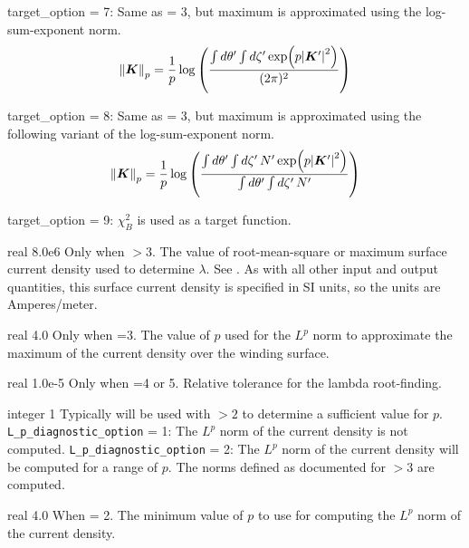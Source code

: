 {{\ttfamily target\_option} = 7: Same as  = 3, but maximum is approximated using the log-sum-exponent norm. 
\begin{gather}
\norm{\bm{K}}_p = \frac{1}{p} \log\left( \frac{\int d \theta' \int d \zeta'  \exp (p \abs{\bm{K}'}^2 ) }{ (2 \pi)^2}\right)
\end{gather}

{\ttfamily target\_option} = 8: Same as  = 3, but maximum is approximated using the following variant of the log-sum-exponent norm.
\begin{gather}
\norm{\bm{K}}_p = \frac{1}{p} \log \left( \frac{\int d \theta' \int d \zeta' \, N' \exp (p \abs{\bm{K}'}^2 ) }{ \int d \theta' \int d \zeta' \, N' }\right)
\end{gather}

{\ttfamily target\_option} = 9: $\chi^2_B$ is used as a target function.

}


\myhrule

{real}
{8.0e6}
{Only when $>3$.}
{The value of root-mean-square or maximum surface current density used to determine $\lambda$.
See .
As with all other input and output quantities, this surface current density is specified in SI units,
so the units are Amperes/meter.
}

\myhrule

{real}
{4.0}
{Only when =3.}
{The value of $p$ used for the $L^p$ norm to approximate the maximum of the current density over the
winding surface.}

\myhrule

{real}
{1.0e-5}
{Only when =4 or 5.}
{Relative tolerance for the lambda root-finding.}

\myhrule

{integer}
{1}
{Typically will be used with  $> 2$ to determine a sufficient value for $p$.}
{
\texttt{L\_p\_diagnostic\_option} = 1: The $L^p$ norm of the current density is not computed. 
\texttt{L\_p\_diagnostic\_option} = 2: The $L^p$ norm of the current density will be computed
for a range of $p$. The norms defined as documented for  $> 3$ are computed. 
}

\myhrule

{real}
{4.0}
{When  = 2.}
{
The minimum value of $p$ to use for computing the $L^p$ norm of the current density.
}

